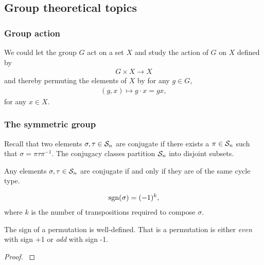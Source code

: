 \subsection{Group theoretical topics}

	\subsubsection{Group action}
	
		We could let the group $G$ act on a set $X$ and study the action of $G$ on $X$ defined by
		\begin{align*}
			G \times X \rightarrow X
		\end{align*}
		and thereby permuting the elements of $X$ by for any $g \in G$,
		\begin{align*}
			(g,x) \mapsto g \cdot x = gx,
		\end{align*}
		for any $x \in X$.
	
	\subsubsection{The symmetric group}
	
		Recall that two elements $\sigma, \tau \in \mathcal{S}_n$ are conjugate if there exists a $\pi \in \mathcal{S}_n$ such that $\sigma = \pi \tau \pi^{-1}$. The conjugacy classes partition $\mathcal{S}_n$ into disjoint subsets. 
		
		\begin{proposition}
			Any elements $\sigma, \tau \in \mathcal{S}_n$ are conjugate if and only if they are of the same cycle type.
		\end{proposition}
		
		\begin{definition}
			\begin{align*}
				\text{sgn}(\sigma) = (-1)^k,
			\end{align*}
			where $k$ is the number of transpositions required to compose $\sigma$.
		\end{definition}
		
		\begin{proposition}\label{prop:signwelldefined}
			The sign of a permutation is well-defined. That is a permutation is either \textit{even} with sign +1 or \textit{odd} with sign -1.
		\end{proposition}
		\begin{proof}
			\cite[Thm.12.6.1.]{Biggs}
		\end{proof}
		
		
		